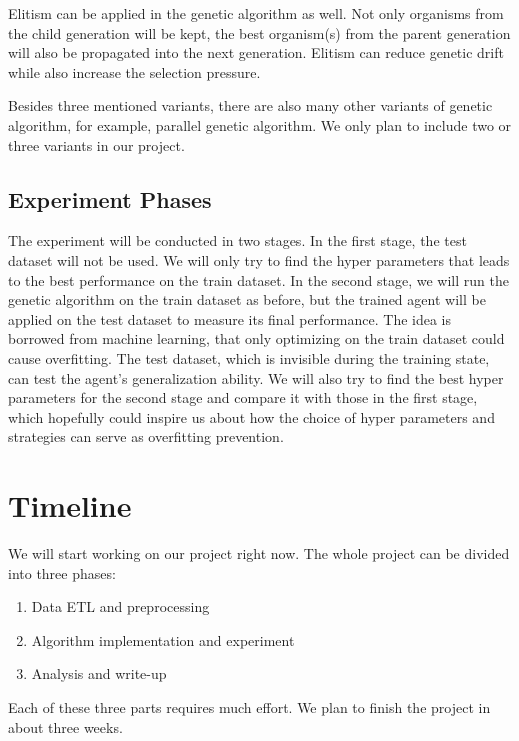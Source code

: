 \documentclass{article}
\begin{document}
Elitism can be applied in the genetic algorithm as well.
Not only organisms from the child generation will be kept, the best organism(s) from the parent generation will also be propagated into the next generation.
Elitism can reduce genetic drift while also increase the selection pressure. \cite{eletism-based-compact-genetic-algorithms}

Besides three mentioned variants, there are also many other variants of genetic algorithm, for example, parallel genetic algorithm. \cite{sizing-populations-for-serial-and-parallel-genetic-algorithms}
We only plan to include two or three variants in our project.

\subsection{Experiment Phases}

The experiment will be conducted in two stages.
In the first stage, the test dataset will not be used.
We will only try to find the hyper parameters that leads to the best performance on the train dataset.
In the second stage, we will run the genetic algorithm on the train dataset as before,
but the trained agent will be applied on the test dataset to measure its final performance.
The idea is borrowed from machine learning, that only optimizing on the train dataset could cause overfitting.
The test dataset, which is invisible during the training state, can test the agent's generalization ability.
We will also try to find the best hyper parameters for the second stage and compare it with those in the first stage,
which hopefully could inspire us about how the choice of hyper parameters and strategies can serve as overfitting prevention.


\section{Timeline}

We will start working on our project right now.
The whole project can be divided into three phases:
\begin{enumerate}
	\item Data ETL and preprocessing
	\item Algorithm implementation and experiment
	\item Analysis and write-up
\end{enumerate}

Each of these three parts requires much effort.
We plan to finish the project in about three weeks.
\end{document}
